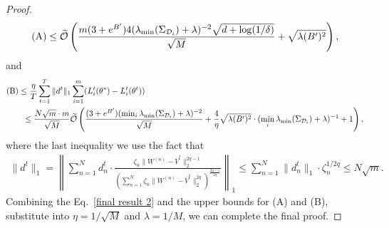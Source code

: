 \begin{proof}
\begin{align*}
    \text{(A)}\le \widetilde{\mathcal{O}}\left(\frac{m(3+e^{B'})4(\lambda_{\min}(\Sigma_{\mathcal{D}_i}) + \lambda)^{-2}\sqrt{d+\log(1/\delta)}}{\sqrt{M}}+\sqrt{\lambda (B')^2}\right),
\end{align*}
and 
\begin{align*}
    &\text{(B)}\le \frac{\eta}{T}\sum_{t=1}^T\|d^t\|_1\sum_{i=1}^m (L_i^t(\theta^*) -L_i^t(\theta^t))\\&\qquad \le \frac{N\sqrt{m}\cdot m}{\sqrt{M}}\widetilde{\mathcal{O}}\left(\frac{(3+e^{B'})(\min_i\lambda_{\min}(\Sigma_{\mathcal{D}_i}) + \lambda)^{-2}}{\sqrt{M}} + \frac{4}{\eta}\sqrt{\lambda (B')^2}\cdot (\min_i\lambda_{\min}(\Sigma_{\mathcal{D}_i})+\lambda )^{-1} + 1\right),
\end{align*}
where the last inequality we use the fact that 
\begin{align*}
    \|d^t\|_1 =  \left\|\sum_{n=1}^Nd_n^t\cdot \frac{\zeta_n\|W^{(n)}- \overline{V}^t\|_2^{2q-1}}{\left(\sum_{n=1}^N \zeta_n\|W^{(n)}- \overline{V}^t\|_2^{2q}\right)^{\frac{2q-1}{2q}}}\right\|_1\le \sum_{n=1}^N \|d_n^t\|_1\cdot \zeta_n^{1/2q} \le N\sqrt{m}.
\end{align*}
Combining the Eq.~\eqref{final result 2} and the upper bounds for (A) and (B), substitute into $\eta = 1/\sqrt{M}$ and $\lambda = 1/M$, we can complete the final proof.
\end{proof}


